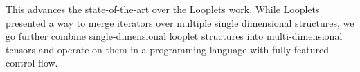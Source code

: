 \begin{enumerate}

\end{enumerate}

This advances the state-of-the-art over the Looplets work. While Looplets presented a way to merge iterators over multiple single dimensional structures, we go further combine single-dimensional looplet structures into multi-dimensional tensors and operate on them in a programming language with fully-featured control flow.
